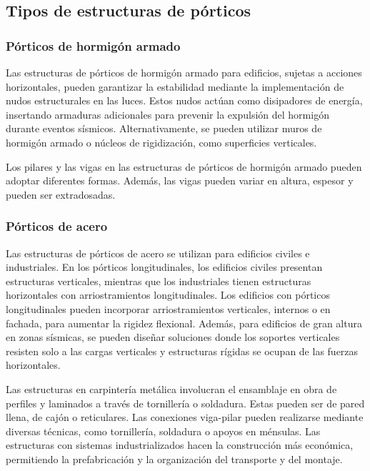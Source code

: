 \documentclass[14pt,letterpaper]{extarticle}
\begin{document}
	\subsection{Tipos de estructuras de pórticos}
	
	\subsubsection{Pórticos de hormigón armado}
	
	Las estructuras de pórticos de hormigón armado para edificios, sujetas a acciones horizontales, pueden garantizar la estabilidad mediante la implementación de nudos estructurales en las luces. Estos nudos actúan como disipadores de energía, insertando armaduras adicionales para prevenir la expulsión del hormigón durante eventos sísmicos. Alternativamente, se pueden utilizar muros de hormigón armado o núcleos de rigidización, como superficies verticales.
	
	Los pilares y las vigas en las estructuras de pórticos de hormigón armado pueden adoptar diferentes formas. Además, las vigas pueden variar en altura, espesor y pueden ser extradosadas.
	
	\subsubsection{Pórticos de acero}
	
	Las estructuras de pórticos de acero se utilizan para edificios civiles e industriales. En los pórticos longitudinales, los edificios civiles presentan estructuras verticales, mientras que los industriales tienen estructuras horizontales con arriostramientos longitudinales. Los edificios con pórticos longitudinales pueden incorporar arriostramientos verticales, internos o en fachada, para aumentar la rigidez flexional. Además, para edificios de gran altura en zonas sísmicas, se pueden diseñar soluciones donde los soportes verticales resisten solo a las cargas verticales y estructuras rígidas se ocupan de las fuerzas horizontales.
	
	Las estructuras en carpintería metálica involucran el ensamblaje en obra de perfiles y laminados a través de tornillería o soldadura. Estas pueden ser de pared llena, de cajón o reticulares. Las conexiones viga-pilar pueden realizarse mediante diversas técnicas, como tornillería, soldadura o apoyos en ménsulas. Las estructuras con sistemas industrializados hacen la construcción más económica, permitiendo la prefabricación y la organización del transporte y del montaje.
	
\end{document}

